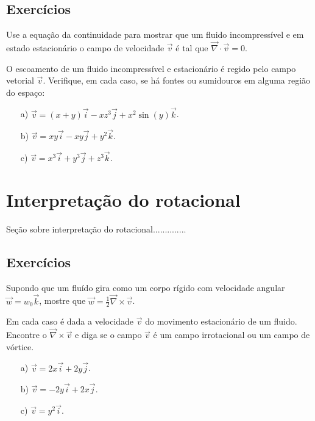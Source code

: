 \subsection*{Exercícios}
\begin{exer}
Use a equação da continuidade para mostrar que um fluido incompressível e em estado estacionário o campo de velocidade $\vec{v}$ é tal que $\vec{\nabla}\cdot \vec{v}=0$.
\end{exer}
\begin{exer}
 O escoamento de um fluido incompressível e estacionário é regido pelo campo vetorial $\vec{v}$. Verifique, em cada caso, se há fontes ou sumidouros em alguma região do espaço:
 \begin{itemize}
  \item[a)] $\vec{v}=(x+y)\vec{i}-xz^3\vec{j}+x^2\sin(y)\vec{k}$.
  \item[b)] $\vec{v}=xy\vec{i}-xy\vec{j}+y^2\vec{k}$.
  \item[c)] $\vec{v}=x^3\vec{i}+y^3\vec{j}+z^3\vec{k}$.

  \end{itemize}

\end{exer}



\section{Interpretação do rotacional}
Seção sobre interpretação do rotacional..............


\subsection*{Exercícios}
\begin{exer}
Supondo que um fluído gira como um corpo rígido com velocidade angular $\vec{w}=w_0\vec{k}$, mostre que $\vec{w}=\frac{1}{2}\vec{\nabla}\times \vec{v}$.
\end{exer}

\begin{exer}
Em cada caso é dada a velocidade $\vec{v}$ do movimento estacionário de um fluido. Encontre o $\vec{\nabla}\times\vec{v}$ e diga se o campo $\vec{v}$ é um campo irrotacional ou um campo de vórtice.
\begin{itemize}
 \item[a)] $\vec{v}=2x\vec{i}+2y\vec{j}$.
 \item[b)] $\vec{v}=-2y\vec{i}+2x\vec{j}$.
 \item[c)] $\vec{v}=y^2\vec{i}$.
 \end{itemize}

\end{exer}


